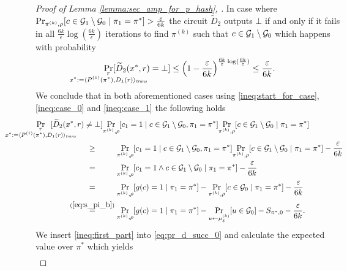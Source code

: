 \begin{proof}[Proof of Lemma \ref{lemma:sec_amp_for_p_hash}, \cite{holenstein2011general}]
In case where $\Pr_{\pi^{(k)}, \rho}[c \in \mathcal{G}_1 \setminus \mathcal{G}_0 \mid \pi_1 = \pi^*] > \frac{\varepsilon}{6k}$ the circuit $\widetilde{D}_2$ outputs $\bot$
if and only if it fails in all $\frac{6k}{\epsilon} \log(\frac{6k}{\epsilon})$ iterations to find $\pi^{(k)}$ such that $c \in \mathcal{G}_1 \setminus \mathcal{G}_0$
which happens with probability
\begin{align}
  \label{ineq:case_1}
\underset{
  \mathclap{
    \substack{
      r \\
      x^* := \langle P^{(1)}(\pi^*), D_1(r) \rangle_{\mathit{trans}}}}}
{\Pr}[\widetilde{D}_2(x^*,r) = \bot]
\leq \Big(1 - \frac{\epsilon}{6k}\Big)^{\frac{6k}{\epsilon}\log(\frac{6k}{\epsilon})} \leq \frac{\epsilon}{6k}.
\end{align}
We conclude that in both aforementioned cases using \eqref{ineq:start_for_case}, \eqref{ineq:case_0} and \eqref{ineq:case_1} the following holds
\begin{align}
  \label{ineq:first_part}
  &\underset{
    \mathclap{
    \substack{r \\
      x^* := \langle P^{(1)}(\pi^*), D_1(r) \rangle_{\mathit{trans}}}}}
  {\Pr}\mkern13mu[\widetilde{D}_2(x^*,r) \neq \bot]
  \underset{\pi^{(k)}, \rho}{\Pr}[c_1 = 1 \mid c \in \cG_1 \setminus \cG_0, \pi_1 = \pi^*]
  \underset{\pi^{(k)}, \rho}{\Pr}[c \in \cG_1 \setminus \cG_0 \mid \pi_1 = \pi^*] \notag\\
  &\IndII \stackrel{\hphantom{(\ref{eq:s_pi_b})}}{\geq}
  \underset{\pi^{(k)}, \rho}{\Pr}[c_1 = 1 \mid c \in \cG_1 \setminus \cG_0, \pi_1 = \pi^*]\underset{\pi^{(k)}, \rho}
  {\Pr}[c \in \cG_1 \setminus \cG_0 \mid \pi_1 = \pi^*] - \frac{\epsilon}{6k} \notag\\
  &\IndII \stackrel{\hphantom{(\ref{eq:s_pi_b})}}{=}
  \underset{\pi^{(k)}, \rho}{\Pr}[c_1 = 1 \land c \in \cG_1 \setminus \cG_0 \mid \pi_1 = \pi^*] - \frac{\epsilon}{6k} \notag\\
  &\IndII \stackrel{\hphantom{(\ref{eq:s_pi_b})}}{=}
  \underset{\pi^{(k)}, \rho}{\Pr}[g(c) = 1 \mid \pi_1 = \pi^*] -  \underset{\pi^{(k)}, \rho}{\Pr}[c \in \cG_0 \mid \pi_1 = \pi^*] - \frac{\epsilon}{6k} \notag\\
  &\IndII \stackrel{(\ref{eq:s_pi_b})}{=}
   \underset{\pi^{(k)}, \rho}{\Pr}[g(c) = 1 \mid \pi_1 = \pi^*] -  \underset{u \leftarrow \mu_{\delta}^{(k)}}{\Pr}[u \in \cG_0]  - S_{\pi^*,0} - \frac{\epsilon}{6k}.
\end{align}
We insert \eqref{ineq:first_part} into \eqref{eq:pr_d_succ_0} and calculate the expected value over $\pi^*$ which yields
\begin{align}

\end{align}
\end{proof}
